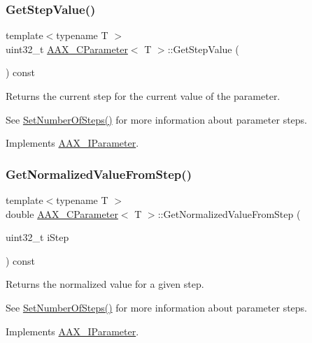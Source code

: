 \subsubsection{\texorpdfstring{GetStepValue()}{GetStepValue()}}
{\footnotesize\ttfamily template$<$typename T $>$ \\
uint32\+\_\+t \mbox{\hyperlink{a01537}{A\+A\+X\+\_\+\+C\+Parameter}}$<$ T $>$\+::Get\+Step\+Value (\begin{DoxyParamCaption}{ }\end{DoxyParamCaption}) const\hspace{0.3cm}{\ttfamily [virtual]}}



Returns the current step for the current value of the parameter. 

See \mbox{\hyperlink{a01537_ac1c0ee92affe0379a58411955d27bb2b}{Set\+Number\+Of\+Steps()}} for more information about parameter steps. 

Implements \mbox{\hyperlink{a01857_ad4fc7431439f53cc0253d191b19db00b}{A\+A\+X\+\_\+\+I\+Parameter}}.

\mbox{\label{a01537_aa2ad88cfd15eae17f5ec18027e738950}} 
\subsubsection{\texorpdfstring{GetNormalizedValueFromStep()}{GetNormalizedValueFromStep()}}
{\footnotesize\ttfamily template$<$typename T $>$ \\
double \mbox{\hyperlink{a01537}{A\+A\+X\+\_\+\+C\+Parameter}}$<$ T $>$\+::Get\+Normalized\+Value\+From\+Step (\begin{DoxyParamCaption}\item[{uint32\+\_\+t}]{i\+Step }\end{DoxyParamCaption}) const\hspace{0.3cm}{\ttfamily [virtual]}}



Returns the normalized value for a given step. 

See \mbox{\hyperlink{a01537_ac1c0ee92affe0379a58411955d27bb2b}{Set\+Number\+Of\+Steps()}} for more information about parameter steps. 

Implements \mbox{\hyperlink{a01857_a793cc6ffe2688f26e2afb8277e07ade6}{A\+A\+X\+\_\+\+I\+Parameter}}.

